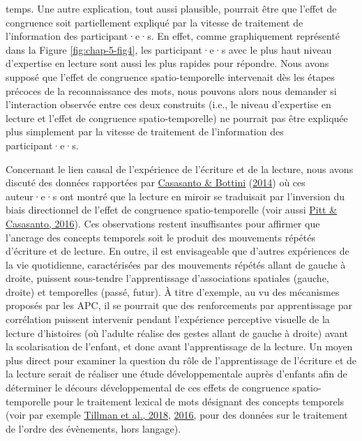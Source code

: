 \documentclass[
  a4paper,12pt,twoside,onecolumn,openright,final,oldfontcommands]{memoir}
\begin{document}
temps. Une autre explication, tout aussi plausible, pourrait être que l'effet de congruence soit partiellement expliqué par la vitesse de traitement de l'information des participant·e·s. En effet, comme graphiquement représenté dans la Figure \ref{fig:chap-5-fig4}, les participant·e·s avec le plus haut niveau d'expertise en lecture sont aussi les plus rapides pour répondre. Nous avons supposé que l'effet de congruence spatio-temporelle intervenait dès les étapes précoces de la reconnaissance des mots, nous pouvons alors nous demander si l'interaction observée entre ces deux construits (i.e., le niveau d'expertise en lecture et l'effet de congruence spatio-temporelle) ne pourrait pas être expliquée plus simplement par la vitesse de traitement de l'information des participant·e·s.

Concernant le lien causal de l'expérience de l'écriture et de la lecture, nous avons discuté des données rapportées par \protect\hyperlink{ref-casasanto_spatial_2014}{Casasanto \& Bottini} (\protect\hyperlink{ref-casasanto_spatial_2014}{2014}) où ces auteur·e·s ont montré que la lecture en miroir se traduisait par l'inversion du biais directionnel de l'effet de congruence spatio-temporelle (voir aussi \protect\hyperlink{ref-pitt_reading_2016}{Pitt \& Casasanto, 2016}). Ces observations restent insuffisantes pour affirmer que l'ancrage des concepts temporels soit le produit des mouvements répétés d'écriture et de lecture. En outre, il est envisageable que d'autres expériences de la vie quotidienne, caractérisées par des mouvements répétés allant de gauche à droite, puissent sous-tendre l'apprentissage d'associations spatiales (gauche, droite) et temporelles (passé, futur). À titre d'exemple, au vu des mécanismes proposés par les APC, il se pourrait que des renforcements par apprentissage par corrélation puissent intervenir pendant l'expérience perceptive visuelle de la lecture d'histoires (où l'adulte réalise des gestes allant de gauche à droite) avant la scolarisation de l'enfant, et donc avant l'apprentissage de la lecture. Un moyen plus direct pour examiner la question du rôle de l'apprentissage de l'écriture et de la lecture serait de réaliser une étude développementale auprès d'enfants afin de déterminer le décours développemental de ces effets de congruence spatio-temporelle pour le traitement lexical de mots désignant des concepts temporels (voir par exemple \protect\hyperlink{ref-tillman_mental_2018}{Tillman et al., 2018}, \protect\hyperlink{ref-tillman_building_2016}{2016}, pour des données sur le traitement de l'ordre des évènements, hors langage).
\end{document}
